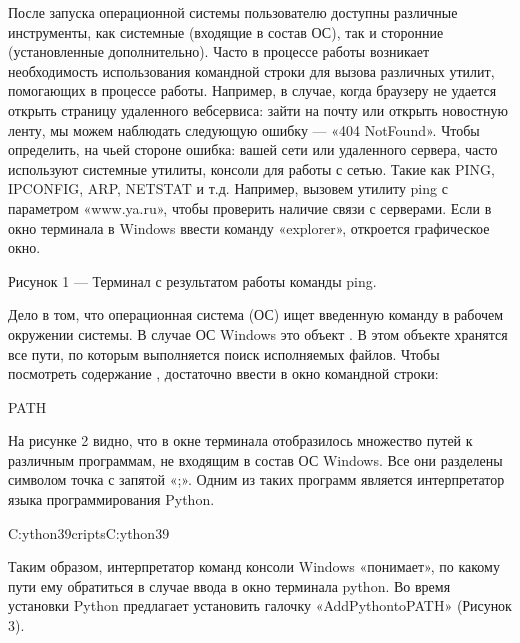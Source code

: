 \documentclass[letterpaper,10pt,russian]{sphinxmanual}
\begin{document}
\sphinxAtStartPar
После запуска операционной системы пользователю доступны различные инструменты, как системные (входящие в состав ОС), так и сторонние (установленные дополнительно). Часто в процессе работы возникает необходимость использования командной строки для вызова различных утилит, помогающих в процессе работы. Например, в случае, когда браузеру не удается открыть страницу удаленного веб\sphinxhyphen{}сервиса: зайти на почту или открыть новостную ленту, мы можем наблюдать следующую ошибку — «404 NotFound». Чтобы определить, на чьей стороне ошибка: вашей сети или удаленного сервера, часто используют системные утилиты, консоли для работы с сетью. Такие как PING, IPCONFIG, ARP, NETSTAT и т.д. Например, вызовем утилиту ping с параметром «www.ya.ru», чтобы проверить наличие связи с серверами. Если в окно терминала в Windows ввести команду «explorer», откроется графическое окно.

\sphinxAtStartPar
{}

\sphinxAtStartPar
Рисунок 1 — Терминал с результатом работы команды ping.

\sphinxAtStartPar
{}
Дело в том, что операционная система (ОС) ищет введенную команду в рабочем окружении системы. В случае ОС Windows это объект . В этом объекте хранятся все пути, по которым выполняется поиск исполняемых файлов.
Чтобы посмотреть содержание , достаточно ввести в окно командной строки:

\begin{sphinxVerbatim}[commandchars=\\\{\}]
\PYGZpc{}PATH\PYGZpc{}
\end{sphinxVerbatim}

\sphinxAtStartPar
На рисунке 2 видно, что в окне терминала отобразилось множество путей к различным программам, не входящим в состав ОС Windows. Все они разделены символом точка с запятой «;». Одним из таких программ является интерпретатор языка программирования Python.

\begin{sphinxVerbatim}[commandchars=\\\{\}]
C:ython39criptsC:ython39
\end{sphinxVerbatim}

\sphinxAtStartPar
Таким образом, интерпретатор команд консоли Windows «понимает», по какому пути ему обратиться в случае ввода в окно терминала python. Во время установки Python предлагает установить галочку «AddPythontoPATH» (Рисунок 3).
\end{document}
